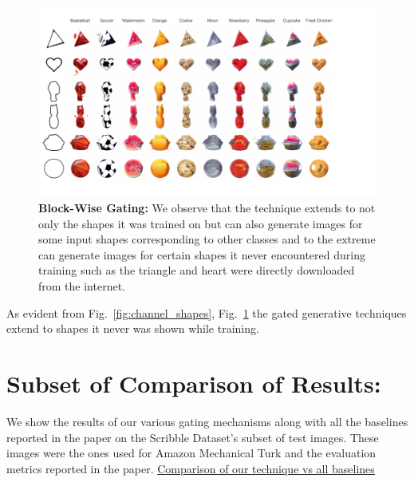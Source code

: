 \documentclass[10pt,twocolumn,letterpaper]{article}
\def\figref#1{Fig.~\ref{#1}}
\begin{document}
\begin{figure}[t]
    \centering
    \includegraphics[width=\linewidth,trim={0 0 4.5cm 0},clip]{paper_images/supplementary_grid_block.pdf}
    \caption{{\bf Block-Wise Gating:} We observe that the technique extends to not only the shapes it was trained on but can also generate images for some input shapes corresponding to other classes and to the extreme can generate images for certain shapes it never encountered during training such as the triangle and heart were directly downloaded from the internet. }
    \label{fig:block_shapes}
    \vspace{-3mm}
\end{figure}

As evident from \figref{fig:channel_shapes}, \figref{fig:block_shapes} the gated generative techniques extend to shapes it never was shown while training. 

\section{Subset of Comparison of Results:}

We show the results of our various gating mechanisms along with all the baselines reported in the paper on the Scribble Dataset's subset of test images. These images were the ones used for Amazon Mechanical Turk and the evaluation metrics reported in the paper.
\href{http://www.robots.ox.ac.uk/~arnabg/all_results_supplementary/index.html}{Comparison of our technique vs all baselines}
\end{document}
